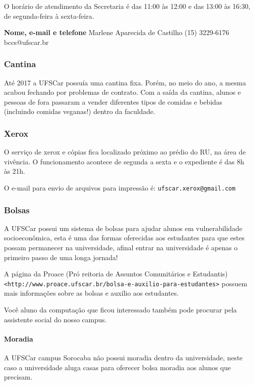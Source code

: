 O horário de atendimento da Secretaria é das 11:00 às 12:00 e das 13:00 às 16:30, de segunda-feira à sexta-feira.

\noindent \textbf{Nome, e-mail e telefone}
  \newline Marlene Aparecida de Castilho
  \newline (15) 3229-6176
  \newline bccs@ufscar.br

\subsubsection{Cantina}
Até 2017 a UFSCar possuía uma cantina fixa. Porém, no meio do ano, a mesma acabou fechando por problemas de contrato. Com a saída da cantina, alunos e pessoas de fora passaram a vender diferentes tipos de comidas e bebidas (incluindo comidas veganas!) dentro da faculdade.

\subsubsection{Xerox}
O serviço de xerox e cópias fica localizado próximo ao prédio do RU, na área de vivência. O funcionamento acontece de segunda a sexta e o expediente é das 8h às 21h.

O e-mail para envio de arquivos para impressão é: \texttt{ufscar.xerox@gmail.com}


\subsubsection{Bolsas}
A UFSCar possui um sistema de bolsas para ajudar alunos em vulnerabilidade socioeconômica, esta é uma das formas oferecidas aos estudantes para que estes possam permanecer na universidade, afinal entrar na universidade é apenas o primeiro passo de uma longa jornada!

A página da Proace (Pró reitoria de Assuntos Comunitários e Estudantis) \newline \texttt{<http://www.proace.ufscar.br/bolsa-e-auxilio-para-estudantes>} possuem mais informações sobre as bolsas e auxílio aos estudantes.

Você aluno da computação que ficou interessado também pode procurar pela assistente social do nosso campus.

\paragraph{Moradia}\label{moradia}
A UFSCar campus Sorocaba não possui moradia dentro da universidade, neste caso a universidade aluga casas para oferecer bolsa moradia aos alunos que precisam.

